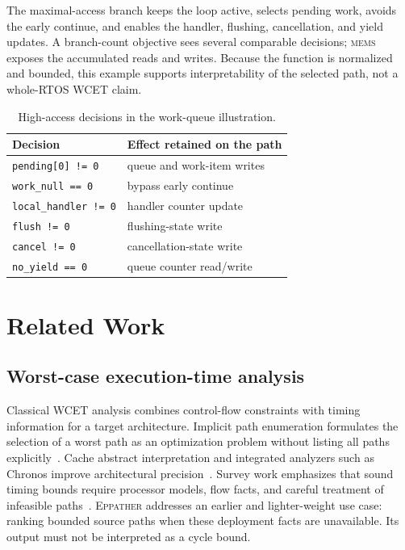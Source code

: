 \documentclass[10pt,conference]{IEEEtran}
\newcommand{\mems}{\textsc{mems}\xspace}
\newcommand{\tool}{\textsc{Eppather}\xspace}
\newcommand{\code}[1]{\texttt{#1}}
\begin{document}
The maximal-access branch keeps the loop active, selects pending work, avoids the early continue, and enables the handler, flushing, cancellation, and yield updates. A branch-count objective sees several comparable decisions; \mems exposes the accumulated reads and writes. Because the function is normalized and bounded, this example supports interpretability of the selected path, not a whole-RTOS WCET claim.

\begin{table}[t]
\centering
\caption{High-access decisions in the work-queue illustration.}
\label{tab:zephyr-path}
\begin{tabular}{ll}
\toprule
Decision & Effect retained on the path\\
\midrule
\code{pending[0] != 0} & queue and work-item writes\\
\code{work\_null == 0} & bypass early continue\\
\code{local\_handler != 0} & handler counter update\\
\code{flush != 0} & flushing-state write\\
\code{cancel != 0} & cancellation-state write\\
\code{no\_yield == 0} & queue counter read/write\\
\bottomrule
\end{tabular}
\end{table}

\section{Related Work}
\subsection{Worst-case execution-time analysis}
Classical WCET analysis combines control-flow constraints with timing information for a target architecture. Implicit path enumeration formulates the selection of a worst path as an optimization problem without listing all paths explicitly~\cite{li1995ipet}. Cache abstract interpretation and integrated analyzers such as Chronos improve architectural precision~\cite{ferdinand1999cache,li2007chronos}. Survey work emphasizes that sound timing bounds require processor models, flow facts, and careful treatment of infeasible paths~\cite{wilhelm2008wcet}. \tool addresses an earlier and lighter-weight use case: ranking bounded source paths when these deployment facts are unavailable. Its output must not be interpreted as a cycle bound.
\end{document}
